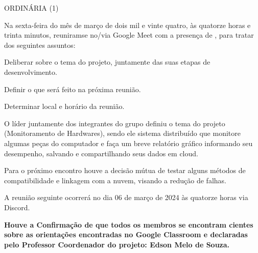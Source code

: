 \documentclass[11pt,twoside]{ata}
\date{01 de março de 2024}
\begin{document}
\begin{reuniao}{ORDINÁRIA (1)}

    Na sexta-feira do mês de março de dois mil e vinte quatro, às quatorze horas e trinta minutos, reuniramse no/via Google Meet com a presença de  , para tratar dos seguintes assuntos:

    \begin{informes}
        \item Deliberar sobre o tema do projeto, juntamente das suas etapas de desenvolvimento. 
        \item Definir o que será feito na próxima reunião.      
        \item Determinar local e horário da reunião.
    \end{informes}
 
    \begin{assuntos}
        \item O líder juntamente dos integrantes do grupo definiu o tema do projeto (Monitoramento de Hardwares), sendo ele sistema distribuído que monitore algumas peças do computador e faça um breve relatório gráfico informando seu desempenho, salvando e compartilhando seus dados em cloud. 
        \item Para o próximo encontro houve a decisão mútua de testar alguns métodos de compatibilidade e linkagem com a nuvem, visando a redução de falhas.   
        \item A reunião seguinte ocorrerá no dia 06 de março de 2024 às quatorze horas via Discord. 
    \end{assuntos}
        
\end{reuniao}

    \begin{declaracao}
        \item\textbf{Houve a Confirmação de que todos os membros se encontram cientes sobre as orientações encontradas no Google Classroom e declaradas pelo Professor Coordenador do projeto: Edson Melo de Souza.}\\
    \end{declaracao}

\end{document}
